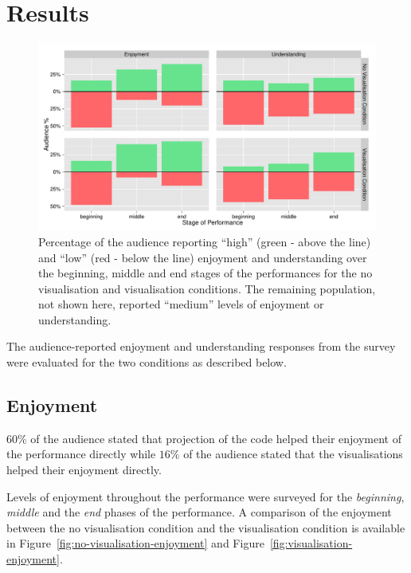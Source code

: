 \section{Results}

\begin{figure}
  \centering
  \includegraphics[width=\columnwidth]{../study-3/results/dimension-condition-study-3.pdf}
  \caption[Follow-up user study survey condition and dimension results]{Percentage of the audience reporting ``high'' (green - above the line) and ``low'' (red - below the line) enjoyment and understanding over the beginning, middle and end stages of the performances for the no visualisation and visualisation conditions. The remaining population, not shown here, reported ``medium'' levels of enjoyment or understanding.}
  \label{fig:dimension-condition-follow-up-user-study}
\end{figure}

The audience-reported enjoyment and understanding responses from the survey were evaluated for the two conditions as described below.

\subsection{Enjoyment}



$60\%$ of the audience stated that projection of the code helped their enjoyment of the performance directly while $16\%$ of the audience stated that the visualisations helped their enjoyment directly.

Levels of enjoyment throughout the performance were surveyed for the \emph{beginning}, \emph{middle} and the \emph{end} phases of the performance. A comparison of the enjoyment between the no visualisation condition and the visualisation condition is available in Figure~\ref{fig:no-visualisation-enjoyment} and Figure~\ref{fig:visualisation-enjoyment}.

